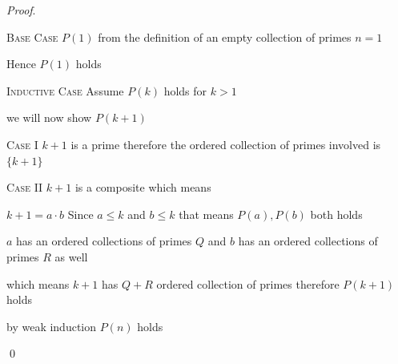 
\textit{Proof}.

\textsc{Base Case}
$P(1)$ from the definition of an empty collection of primes $n=1$

Hence $P(1)$ holds

\textsc{Inductive Case}
Assume $P(k)$ holds for $k > 1$

we will now show $P(k+1)$

\textsc{Case I} $k+1$ is a prime therefore the ordered collection of primes involved is $\{k+1\}$

\textsc{Case II} $k+1$ is a composite which means

$k+1 = a \cdot b$ Since $a \leq k$ and $b \leq k$ that means $P(a), P(b)$ both holds

$a$ has an ordered collections of primes $Q$ and $b$ has an ordered collections of primes $R$ as well

which means $k+1$ has $Q + R$ ordered collection of primes therefore $P(k+1)$ holds

by weak induction $P(n)$ holds

\qed
